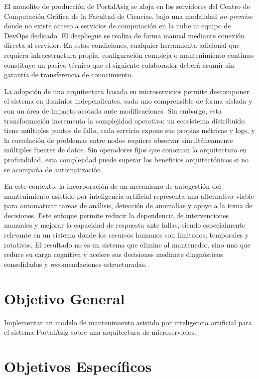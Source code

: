 El monolito de producci\'{o}n de PortalAsig se aloja en los servidores del Centro de
Computaci\'{o}n Gr\'{a}fica de la Facultad de Ciencias, bajo una modalidad \textit{on-premise} donde no
existe acceso a servicios de computaci\'{o}n en la nube ni equipo de DevOps dedicado.
El despliegue se realiza de forma manual mediante conexi\'{o}n directa al servidor. En estas condiciones, cualquier
herramienta adicional que requiera infraestructura propia, configuraci\'{o}n compleja o
mantenimiento continuo constituye un pasivo t\'{e}cnico que el siguiente colaborador
deber\'{a} asumir sin garant\'{i}a de transferencia de conocimiento.

La adopci\'{o}n de una arquitectura basada en microservicios permite descomponer el
sistema en dominios independientes, cada uno comprensible de forma aislada y con
un \'{a}rea de impacto acotada ante modificaciones. Sin embargo, esta transformaci\'{o}n
incrementa la complejidad operativa: un ecosistema distribuido tiene m\'{u}ltiples
puntos de fallo, cada servicio expone sus propias m\'{e}tricas y logs, y la
correlaci\'{o}n de problemas entre nodos requiere observar simult\'{a}neamente m\'{u}ltiples
fuentes de datos. Sin operadores fijos que conozcan la arquitectura en profundidad, esta
complejidad puede superar los beneficios arquitect\'{o}nicos si no se acompa\~{n}a de
automatizaci\'{o}n.

En este contexto, la incorporaci\'{o}n de un mecanismo de autogesti\'{o}n del
mantenimiento asistido por inteligencia artificial representa una alternativa
viable para automatizar tareas de an\'{a}lisis, detecci\'{o}n de anomal\'{i}as y apoyo a la
toma de decisiones. Este enfoque permite reducir la dependencia de intervenciones
manuales y mejorar la capacidad de respuesta ante fallas, siendo especialmente
relevante en un sistema donde los recursos humanos son limitados, temporales y
rotativos. El resultado no es un sistema que elimine al mantenedor, sino uno que
reduce su carga cognitiva y acelere sus decisiones mediante diagn\'{o}sticos
consolidados y recomendaciones estructuradas.

\section{Objetivo General}

Implementar un modelo de mantenimiento asistido por inteligencia artificial
para el sistema PortalAsig sobre una arquitectura de microservicios.

\section{Objetivos Espec\'{i}ficos}

